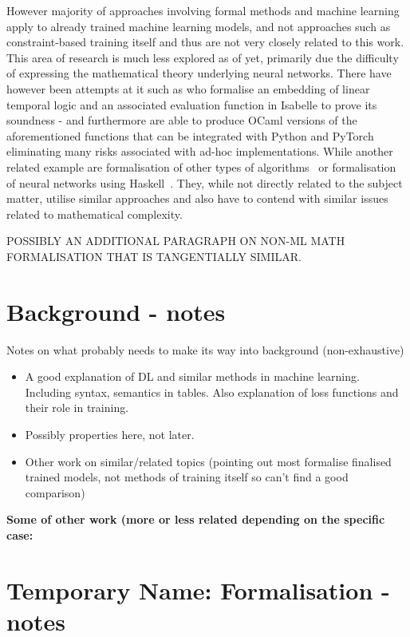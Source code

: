 \documentclass[a4paper,10pt]{article}
\begin{document}
However majority of approaches involving formal methods and machine learning  apply to already trained machine learning models, and not approaches such as constraint-based training itself and thus are not very closely related to this work. This area of research is much less explored as of yet, primarily due the difficulty of expressing the mathematical theory underlying neural networks. There have however been attempts at it such as \cite{chevallier2022constrained} who formalise an embedding of linear temporal logic and an associated evaluation function in Isabelle to prove its soundness - and furthermore are able to produce OCaml versions of the aforementioned functions that can be integrated with Python and PyTorch eliminating many risks associated with ad-hoc implementations. 
While another related example are formalisation of other types of algorithms~\cite{daukantas2021trimming} or formalisation of neural networks using Haskell~\cite{xie2023haskell}. They, while not directly related to the subject matter, utilise similar approaches and also have to contend with similar issues related to mathematical complexity.

POSSIBLY AN ADDITIONAL PARAGRAPH ON NON-ML MATH FORMALISATION THAT IS TANGENTIALLY SIMILAR.



\section{Background - notes}
Notes on what probably needs to make its way into background (non-exhaustive)
\begin{itemize}
	\item A good explanation of DL and similar methods in machine learning. Including syntax, semantics in tables. Also explanation of loss functions and their role in training.
	\item Possibly properties here, not later.
	\item Other work on similar/related topics (pointing out most formalise finalised trained models, not methods of training itself so can't find a good comparison)
\end{itemize}

\textbf{Some of other work (more or less related depending on the specific case:}
 




\section{Temporary Name: Formalisation - notes}
\end{document}
